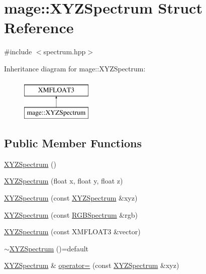 \hypertarget{structmage_1_1_x_y_z_spectrum}{}\section{mage\+:\+:X\+Y\+Z\+Spectrum Struct Reference}
\label{structmage_1_1_x_y_z_spectrum}


{\ttfamily \#include $<$spectrum.\+hpp$>$}

Inheritance diagram for mage\+:\+:X\+Y\+Z\+Spectrum\+:\begin{figure}[H]
\begin{center}
\leavevmode
\includegraphics[height=2.000000cm]{structmage_1_1_x_y_z_spectrum}
\end{center}
\end{figure}
\subsection*{Public Member Functions}
\begin{DoxyCompactItemize}
\item 
\hyperlink{structmage_1_1_x_y_z_spectrum_a93dbb49e9cb90dd0aed70e9b6d01fcc8}{X\+Y\+Z\+Spectrum} ()
\item 
\hyperlink{structmage_1_1_x_y_z_spectrum_ab768ef493970dd791f8b145eee05f66b}{X\+Y\+Z\+Spectrum} (float x, float y, float z)
\item 
\hyperlink{structmage_1_1_x_y_z_spectrum_ac86feefa604d578f219d17f721508357}{X\+Y\+Z\+Spectrum} (const \hyperlink{structmage_1_1_x_y_z_spectrum}{X\+Y\+Z\+Spectrum} \&xyz)
\item 
\hyperlink{structmage_1_1_x_y_z_spectrum_a91cf5d611fbad0e47b6718a04b9a505d}{X\+Y\+Z\+Spectrum} (const \hyperlink{structmage_1_1_r_g_b_spectrum}{R\+G\+B\+Spectrum} \&rgb)
\item 
\hyperlink{structmage_1_1_x_y_z_spectrum_a4775c0f3d8bff524281c186ee5e91e60}{X\+Y\+Z\+Spectrum} (const X\+M\+F\+L\+O\+A\+T3 \&vector)
\item 
\hyperlink{structmage_1_1_x_y_z_spectrum_af3a318ebdb1eb1e47cd81707850049a7}{$\sim$\+X\+Y\+Z\+Spectrum} ()=default
\item 
\hyperlink{structmage_1_1_x_y_z_spectrum}{X\+Y\+Z\+Spectrum} \& \hyperlink{structmage_1_1_x_y_z_spectrum_a99b3956d6e9c0255fdef3ad9ea9e4d3a}{operator=} (const \hyperlink{structmage_1_1_x_y_z_spectrum}{X\+Y\+Z\+Spectrum} \&xyz)
\end{DoxyCompactItemize}


